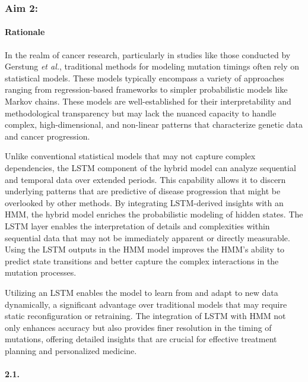 \subsubsection{Aim 2: \SpecificAimTwo}

\paragraph{Rationale}

In the realm of cancer research, particularly in studies like those conducted by Gerstung \textit{et al.}, 
traditional methods for modeling mutation timings often rely on statistical models.
These models typically encompass a variety of approaches ranging from regression-based 
frameworks to simpler probabilistic models like Markov chains.
These models are well-established for their interpretability and methodological transparency but 
may lack the nuanced capacity to handle complex, high-dimensional, 
and non-linear patterns that characterize genetic data and cancer progression. %

Unlike conventional statistical models that may not capture complex dependencies, 
the LSTM component of the hybrid model can analyze sequential and temporal data over extended periods. 
This capability allows it to discern underlying patterns that are predictive of 
disease progression that might be overlooked by other methods.
By integrating LSTM-derived insights with an HMM, 
the hybrid model enriches the probabilistic modeling of hidden states. 
The LSTM layer enables the interpretation of details and complexities within 
sequential data that may not be immediately apparent or directly measurable.
Using the LSTM outputs in the HMM model improves the HMM's ability to predict state transitions 
and better capture the complex interactions in the mutation processes.

Utilizing an LSTM enables the model to learn from and adapt to new data dynamically, 
a significant advantage over traditional models that may require static reconfiguration or retraining. 
The integration of LSTM with HMM not only enhances accuracy but also provides finer resolution in the timing of mutations, 
offering detailed insights that are crucial for effective treatment planning and personalized medicine.

\paragraph{2.1. \SpecificAimTwoA}

